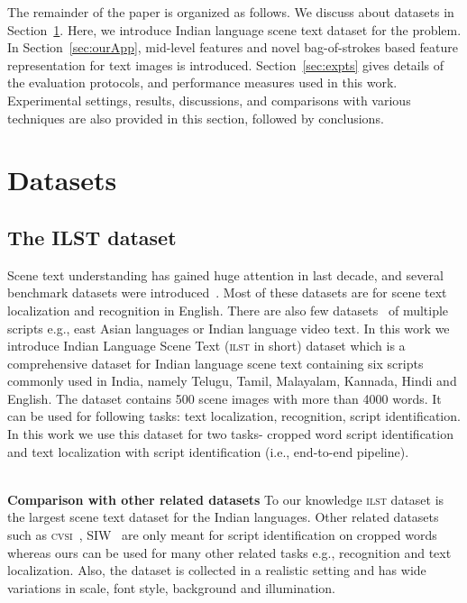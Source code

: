 The remainder of the paper is organized as follows. 
We discuss about datasets in Section~\ref{sec:datasets}. Here,
we introduce Indian language scene text dataset for the problem.
In Section~\ref{sec:ourApp}, mid-level features and novel bag-of-strokes based feature representation for text images is introduced. Section~\ref{sec:expts} gives details of the evaluation protocols, and performance measures used in this work. Experimental settings, results, discussions, and comparisons with various techniques are also provided  in this section, followed by conclusions.

\section{Datasets}
\label{sec:datasets}
\subsection{The ILST dataset}
Scene text understanding has gained huge attention in last decade, and several benchmark datasets were introduced~\cite{ICDARcomp11, MishraBMVC12}.
Most of these datasets are for scene text localization and recognition in English. There are also few datasets~\cite{SIWIcdar,CVSIComp} of multiple scripts e.g., east Asian languages or Indian language video text. In this work we introduce Indian Language Scene Text (\textsc{ilst} in short) dataset which is a comprehensive dataset for Indian language scene text containing six scripts commonly used in India, namely Telugu, Tamil, Malayalam, Kannada, Hindi and English. The dataset contains 500 scene images with more than 4000 words. It can be used for following tasks: text localization, recognition, script identification. In this work we use this dataset for two tasks- cropped word script identification and text localization with script identification (i.e., end-to-end pipeline).
\\
\


\noindent\textbf{Comparison with other related datasets}
To our knowledge \textsc{ilst} dataset is the largest scene text dataset for the Indian languages. Other related datasets such as \textsc{cvsi}~\cite{CVSIComp}, SIW~\cite{SIWIcdar} are only meant for script identification on cropped words whereas ours can be used for many other related tasks e.g., recognition and text localization. Also, the dataset is collected in a realistic setting and has wide variations in scale, font style, background and illumination. 
\\
\


